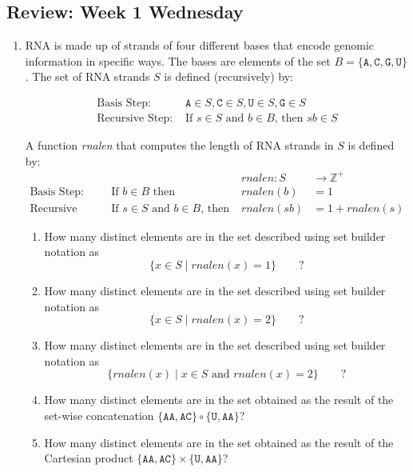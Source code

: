 \documentclass[12pt, oneside]{article}
\newcommand{\A}[0]{\texttt{A}}
\newcommand{\C}[0]{\texttt{C}}
\newcommand{\G}[0]{\texttt{G}}
\newcommand{\U}[0]{\texttt{U}}
\begin{document}
\subsection*{Review: Week 1 Wednesday}
\begin{enumerate}
    \item {

RNA is made up of strands of four different bases that encode genomic information
in specific ways. The bases are elements of the set 
$B  = \{\A, \C, \G, \U \}$. The set of RNA strands $S$ is defined (recursively) by:

\[
\begin{array}{ll}
\textrm{Basis Step: } & \A \in S, \C \in S, \U \in S, \G \in S \\
\textrm{Recursive Step: } & \textrm{If } s \in S\textrm{ and }b \in B \textrm{, then }sb \in S
\end{array}
\]

A function \textit{rnalen} that computes the length of RNA strands in $S$ is defined by:
\[
\begin{array}{llll}
& & \textit{rnalen} : S & \to \mathbb{Z}^+ \\
\textrm{Basis Step:} & \textrm{If } b \in B\textrm{ then } & \textit{rnalen}(b) & = 1 \\
\textrm{Recursive Step:} & \textrm{If } s \in S\textrm{ and }b \in B\textrm{, then  } & \textit{rnalen}(sb) & = 1 + \textit{rnalen}(s)
\end{array}
\]

\begin{enumerate}
\item How many distinct elements are in the set described using set builder notation as 
\[
\{ x \in S \mid rnalen(x) = 1\} \qquad ?
\]

\item How many distinct elements are in the set described using set builder notation as 
\[
\{ x \in S \mid rnalen(x) = 2\} \qquad ?
\]

\item How many distinct elements are in the set described using set builder notation as 
\[
\{ rnalen(x) \mid x \in S \text{ and } rnalen(x) = 2\} \qquad ?
\]


\item How many distinct elements are in the set obtained as the result
of the set-wise concatenation $\{ \A\A, \A\C \} \circ \{\U, \A\A \}$?

\item How many distinct elements are in the set obtained as the result
of the Cartesian product $\{ \A\A, \A\C \} \times \{\U, \A\A \}$?


\end{enumerate}}
\end{enumerate}
\end{document}
